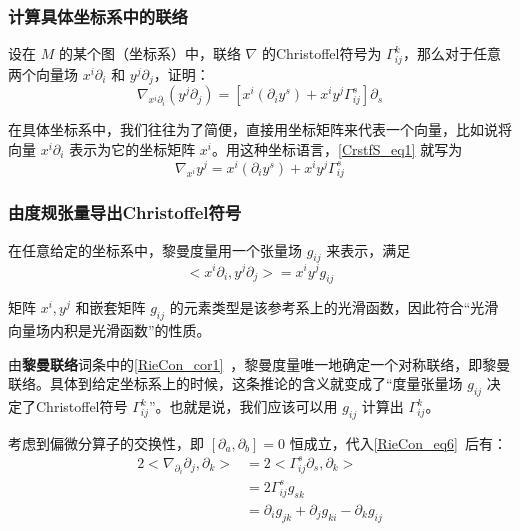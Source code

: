 \subsubsection{计算具体坐标系中的联络}

\begin{exercise}{}
设在 $M$ 的某个图（坐标系）中，联络 $\nabla$ 的Christoffel符号为 $\Gamma^k_{ij}$，那么对于任意两个向量场 $x^i\partial_i$ 和 $y^j\partial_j$，证明：
\begin{equation}\label{CrstfS_eq1}
\nabla_{x^i\partial_i}(y^j\partial_j)=[x^i(\partial_iy^s)+x^iy^j\Gamma^s_{ij}]\partial_s
\end{equation}
\end{exercise}

在具体坐标系中，我们往往为了简便，直接用坐标矩阵来代表一个向量，比如说将向量 $x^i\partial_i$ 表示为它的坐标矩阵 $x^i$。用这种坐标语言，\autoref{CrstfS_eq1} 就写为
\begin{equation}\label{CrstfS_eq4}
\nabla_{x^i}y^j=x^i(\partial_iy^s)+x^iy^j\Gamma^s_{ij}
\end{equation}

\subsubsection{由度规张量导出Christoffel符号}

在任意给定的坐标系中，黎曼度量用一个张量场 $g_{ij}$ 来表示，满足
\begin{equation}
<x^i\partial_i, y^j\partial_j>=x^iy^jg_{ij}
\end{equation}

矩阵 $x^i, y^j$ 和嵌套矩阵 $g_{ij}$ 的元素类型是该参考系上的光滑函数，因此符合“光滑向量场内积是光滑函数”的性质。

由\textbf{黎曼联络}词条中的\autoref{RieCon_cor1}~，黎曼度量唯一地确定一个对称联络，即黎曼联络。具体到给定坐标系上的时候，这条推论的含义就变成了“度量张量场 $g_{ij}$ 决定了Christoffel符号 $\Gamma^k_{ij}$”。也就是说，我们应该可以用 $g_{ij}$ 计算出 $\Gamma^k_{ij}$。

考虑到偏微分算子的交换性，即 $[\partial_a, \partial_b]=0$ 恒成立，代入\autoref{RieCon_eq6}~后有：
\begin{equation}\label{CrstfS_eq2}
\begin{aligned}
2<\nabla_{\partial_i}\partial_j, \partial_k>&=2<\Gamma^s_{ij}\partial_s, \partial_k>\\
&=2\Gamma^s_{ij}g_{sk}\\
&=\partial_ig_{jk}+\partial_jg_{ki}-\partial_kg_{ij}
\end{aligned}
\end{equation}

